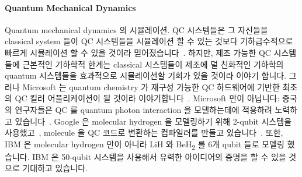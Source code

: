 \paragraph{Quantum Mechanical Dynamics}
\label{sec:future:Quantum Mechanical Dynamics}

Quantum mechanical dynamics 의 시뮬레이션.
QC 시스템들은 그 자신들을 classical system 들이 QC 시스템들을 시뮬레이션 할 수
있는 것보다 기하급수적으로 빠르게 시뮬레이션 할 수 있을 것이라
믿어졌습니다~\cite{Feynman1982}.
하지만, 제조 가능한 QC 시스템들에 근본적인 기하학적 한계는 classical 시스템들이
제조에 덜 친화적인 기하학의 quantum 시스템들을 효과적으로 시뮬레이션할 기회가
있을 것이라 이야기 합니다.
그러나 Microsoft 는 quantum chemistry 가 재구성 가능한 QC 하드웨어에 기반한
최초의 QC 킬러 어플리케이션이 될 것이라
이야기합니다~\cite{TomSimonite2017QC-MS-Chemistry}.
Microsoft 만이 아닙니다: 중국의 연구자들은 QC 를 quantum photon interaction 을
모델하는데에 적용하려 노력하고 있습니다~\cite{StephenChen2017ChinaQC}.
Google 은 molecular hydrogen 을 모델링하기 위해 2-qubit 시스템을
사용했고~\cite{RichardChirgwin2016GoogleQC}, molecule 을 QC 코드로 변환하는
컴파일러를 만들고 있습니다~\cite{RichardChirgwin2017GoogleQC}.
또한, IBM 은 molecular hydrogen 만이 아니라 LiH 와 BeH\textsubscript{2} 를 6개
qubit 들로 모델링 했습니다.
IBM 은 50-qubit 시스템을 사용해서 유력한 아이디어의 증명을 할 수 있을 것으로
기대하고 있습니다.

